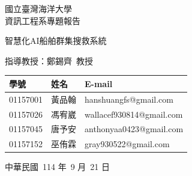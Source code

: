 \documentclass[12pt,a4paper]{article}
\begin{document}
\begin{titlepage}

	\centering
	\vspace*{2cm}
	
	{\Large 國立臺灣海洋大學\\[0.5cm]資訊工程系專題報告 \par}
	
	\vspace*{1cm}
	{\Huge 智慧化AI船舶群集搜救系統 \par}
	
	\vfill
	
	{\Large 指導教授：鄭錫齊\ 教授 \par}
	\vspace*{1cm}
	\begin{tabular}{lll}
	學號 & 姓名 & E-mail \\
	\hline
	01157001 & 黃品翰 & hanshuangfs@gmail.com \\
	01157026 & 馮宥崴 & wallacef930814@gmail.com \\
	01157045 & 唐予安 & anthonyaa0423@gmail.com \\
	01157152 & 巫侑霖 & gray930522@gmail.com
	\end{tabular}

	\vspace*{1cm}
	{\Large 中華民國\ 114 年\ 9 月\ 21 日 \par}

\end{titlepage}

\vspace*{0.3\textheight}
\begin{abstract}
本研究提出一套「智慧化AI船舶群集搜救系統」，旨在改善海上的搜救方式。傳統的搜救常常面臨海象險惡、作業風險高及搜尋範圍廣闊等挑戰，很容易錯過黃金救援時間，且存在高危險性。本研究希望透過無人船的應用，降低搜救人員傷亡風險，同時提升大範圍搜尋的效率，解決現有搜救作業的困難。
\par
為因應上述挑戰，本系統以無人船群集協作為核心，透過演算法規劃搜救路徑，並可根據海流、風向等環境因素即時調整搜尋方向。由於缺乏實體船舶作為驗證平台，本研究採用 Unity 模擬環境進行系統建構與實驗，並針對單人與多人落水情境進行測試，驗證其可行性。
\par
實驗結果顯示，本系統在單一落水搜救情境下達到 82\%  的搜尋成功率，相較於傳統人工搜尋僅約 50\%  的成功率有顯著提升；在多人落水的情況下，系統能搜尋到 78\%  的落水人員。此外，針對因風向影響的落水人員移動，本系統的預測準確率達 81\%。
\par
本研究的貢獻在於證實無人船群集應用於海上搜救的潛力，能有效降低人力風險並縮短救援時間。未來若能進一步導入真實海域測試，並結合感應器精度、通訊穩定性及實際惡劣天候下的作業考量，將更加貼近實際應用的需求，並提升系統的實用價值。

\end{abstract}
\end{document}
